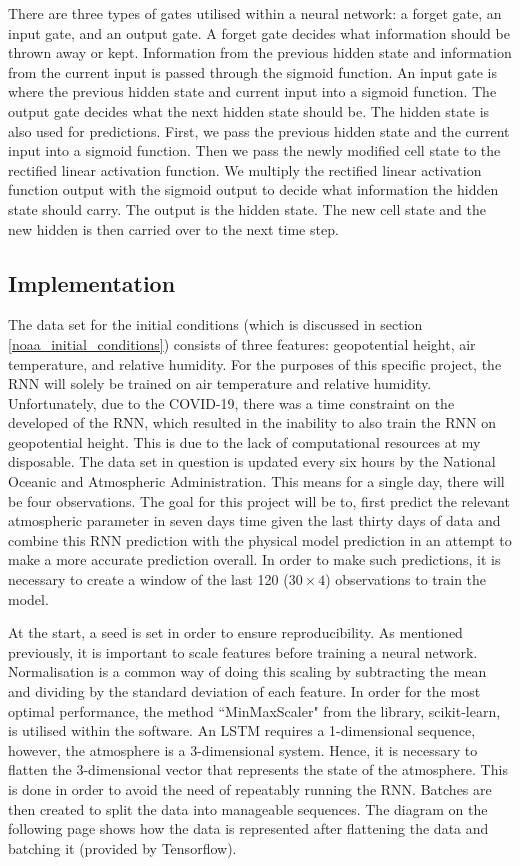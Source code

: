 There are three types of gates utilised within a neural network: a forget gate, an input gate, and an output gate. A forget gate decides what information should be thrown away or kept. Information from the previous hidden state and information from the current input is passed through the sigmoid function. An input gate is where the previous hidden state and current input into a sigmoid function. The output gate decides what the next hidden state should be. The hidden state is also used for predictions. First, we pass the previous hidden state and the current input into a sigmoid function. Then we pass the newly modified cell state to the rectified linear activation function. We multiply the rectified linear activation function output with the sigmoid output to decide what information the hidden state should carry. The output is the hidden state. The new cell state and the new hidden is then carried over to the next time step\cite{lstm_rnn}.

\subsection{Implementation}\label{implement_rnn}
The data set for the initial conditions (which is discussed in section \ref{noaa_initial_conditions}) consists of three features: geopotential height, air temperature, and relative humidity. For the purposes of this specific project, the RNN will solely be trained on air temperature and relative humidity. Unfortunately, due to the COVID-19, there was a time constraint on the developed of the RNN, which resulted in the inability to also train the RNN on geopotential height. This is due to the lack of computational resources at my disposable. The data set in question is updated every six hours by the National Oceanic and Atmospheric Administration. This means for a single day, there will be four observations. The goal for this project will be to, first predict the relevant atmospheric parameter in seven days time given the last thirty days of data and combine this RNN prediction with the physical model prediction in an attempt to make a more accurate prediction overall. In order to make such predictions, it is necessary to create a window of the last 120 ($30 \times 4$) observations to train the model\cite{time_series}.

At the start, a seed is set in order to ensure reproducibility. As mentioned previously, it is important to scale features before training a neural network. Normalisation is a common way of doing this scaling by subtracting the mean and dividing by the standard deviation of each feature. In order for the most optimal performance, the method ``MinMaxScaler" from the library, scikit-learn, is utilised within the software\cite{scikit-learn}. An LSTM requires a 1-dimensional sequence, however, the atmosphere is a 3-dimensional system. Hence, it is necessary to flatten the 3-dimensional vector that represents the state of the atmosphere. This is done in order to avoid the need of repeatably running the RNN. Batches are then created to split the data into manageable sequences. The diagram on the following page shows how the data is represented after flattening the data and batching it (provided by Tensorflow)\cite{time_series}.

